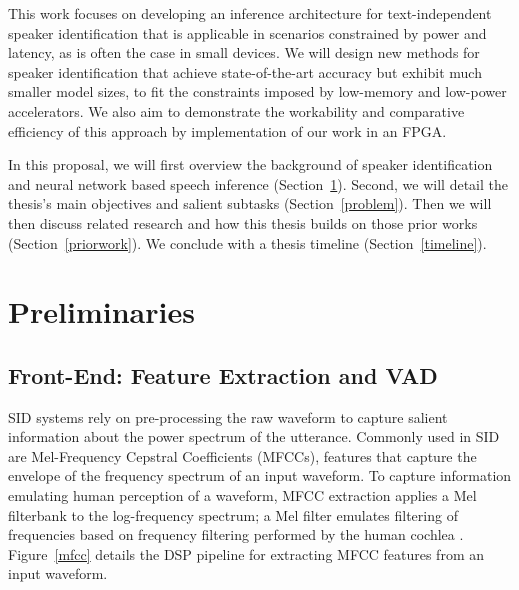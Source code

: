 \documentclass[journal,12pt,onecolumn,draftclsnofoot,]{sty/IEEEtran}
\begin{document}
This work focuses on developing an inference architecture for text-independent speaker identification that is applicable in scenarios constrained by power and latency, as is often the case in small devices. We will design new methods for speaker identification that achieve state-of-the-art accuracy but exhibit much smaller model sizes, to fit the constraints imposed by low-memory and low-power accelerators. We also aim to demonstrate the workability and comparative efficiency of this approach by implementation of our work in an FPGA.

In this proposal, we will first overview the background of speaker identification and neural network based speech inference (Section~\ref{prelim}). Second, we will detail the thesis's main objectives and salient subtasks (Section~\ref{problem}). Then we will then discuss related research and how this thesis builds on those prior works (Section~\ref{priorwork}). We conclude with a thesis timeline (Section~\ref{timeline}).


\section{Preliminaries}
\label{prelim}


\subsection{Front-End: Feature Extraction and VAD}
\label{frontend}
SID systems rely on pre-processing the raw waveform to capture salient information about the power spectrum of the utterance. Commonly used in SID are Mel-Frequency Cepstral Coefficients (MFCCs), features that capture the envelope of the frequency spectrum of an input waveform. To capture information emulating human perception of a waveform, MFCC extraction applies a Mel filterbank to the log-frequency spectrum; a Mel filter emulates filtering of frequencies based on frequency filtering performed by the human cochlea \cite{mfcc_pres}. Figure~\ref{mfcc} details the DSP pipeline for extracting MFCC features from an input waveform.
\end{document}
